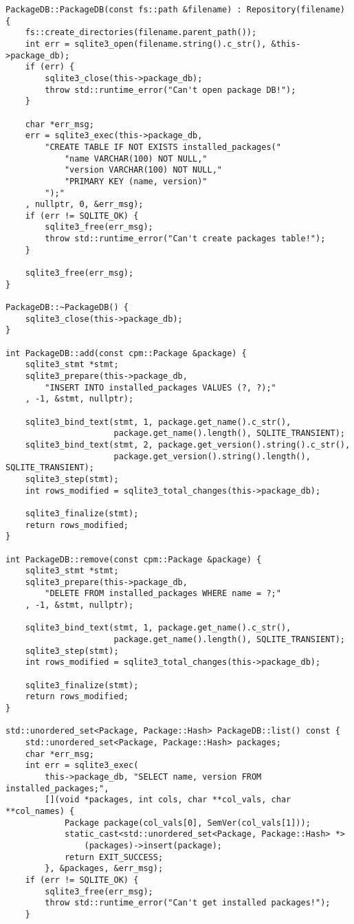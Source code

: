 \begin{lstlisting}[style=cpp,
				   caption=Хранилище за глобално инсталирани пакети,
				   label={lst:package-db}]
PackageDB::PackageDB(const fs::path &filename) : Repository(filename) {
	fs::create_directories(filename.parent_path());
	int err = sqlite3_open(filename.string().c_str(), &this->package_db);
	if (err) {
		sqlite3_close(this->package_db);
		throw std::runtime_error("Can't open package DB!");
	}

	char *err_msg;
	err = sqlite3_exec(this->package_db,
		"CREATE TABLE IF NOT EXISTS installed_packages("
			"name VARCHAR(100) NOT NULL,"
			"version VARCHAR(100) NOT NULL,"
			"PRIMARY KEY (name, version)"
		");"
	, nullptr, 0, &err_msg);
	if (err != SQLITE_OK) {
		sqlite3_free(err_msg);
		throw std::runtime_error("Can't create packages table!");
	}

	sqlite3_free(err_msg);
}

PackageDB::~PackageDB() {
	sqlite3_close(this->package_db);
}

int PackageDB::add(const cpm::Package &package) {
	sqlite3_stmt *stmt;
	sqlite3_prepare(this->package_db,
		"INSERT INTO installed_packages VALUES (?, ?);"
	, -1, &stmt, nullptr);
	
	sqlite3_bind_text(stmt, 1, package.get_name().c_str(),
					  package.get_name().length(), SQLITE_TRANSIENT);
	sqlite3_bind_text(stmt, 2, package.get_version().string().c_str(),
					  package.get_version().string().length(), SQLITE_TRANSIENT);
	sqlite3_step(stmt);
	int rows_modified = sqlite3_total_changes(this->package_db);

	sqlite3_finalize(stmt);
	return rows_modified;
}

int PackageDB::remove(const cpm::Package &package) {
	sqlite3_stmt *stmt;
	sqlite3_prepare(this->package_db,
		"DELETE FROM installed_packages WHERE name = ?;"
	, -1, &stmt, nullptr);
	
	sqlite3_bind_text(stmt, 1, package.get_name().c_str(),
					  package.get_name().length(), SQLITE_TRANSIENT);
	sqlite3_step(stmt);
	int rows_modified = sqlite3_total_changes(this->package_db);
	
	sqlite3_finalize(stmt);
	return rows_modified;
}

std::unordered_set<Package, Package::Hash> PackageDB::list() const {
	std::unordered_set<Package, Package::Hash> packages;
	char *err_msg;
	int err = sqlite3_exec(
		this->package_db, "SELECT name, version FROM installed_packages;",
		[](void *packages, int cols, char **col_vals, char **col_names) {
			Package package(col_vals[0], SemVer(col_vals[1]));
			static_cast<std::unordered_set<Package, Package::Hash> *>
				(packages)->insert(package);
			return EXIT_SUCCESS;
		}, &packages, &err_msg);
	if (err != SQLITE_OK) {
		sqlite3_free(err_msg);
		throw std::runtime_error("Can't get installed packages!");
	}


\end{lstlisting}
